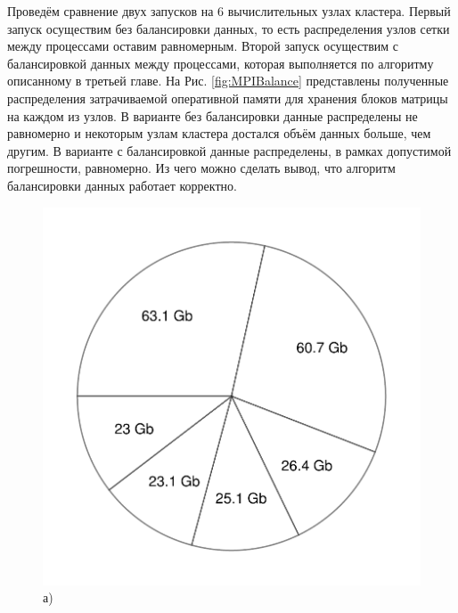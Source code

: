 Проведём сравнение двух запусков на 6 вычислительных узлах кластера. Первый запуск осуществим без балансировки данных, то есть распределения узлов сетки между процессами оставим равномерным. Второй запуск осуществим с балансировкой данных между процессами, которая выполняется по алгоритму описанному в третьей главе. На Рис. \ref{fig:MPIBalance} представлены полученные распределения затрачиваемой оперативной памяти для хранения блоков матрицы на каждом из узлов. В варианте без балансировки данные распределены не равномерно и некоторым узлам кластера достался объём данных больше, чем другим. В варианте с балансировкой данные распределены, в рамках допустимой погрешности, равномерно. Из чего можно сделать вывод, что алгоритм балансировки данных работает корректно.

\begin{figure}[ht]
    \begin{minipage}[b][][b]{0.49\linewidth}\centering
        \includegraphics[width=\linewidth]{pics/PieChartNoBalance.pdf} \\ а)
    \end{minipage}
    \hfill
    \begin{minipage}[b][][b]{0.49\linewidth}\centering

\end{minipage}
\end{figure}
